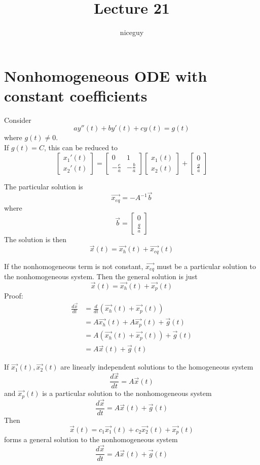 \documentclass[12pt]{article}
\author{niceguy}
\title{Lecture 21}
\begin{document}
\maketitle

\section{Nonhomogeneous ODE with constant coefficients}

Consider
$$ay''(t) + by'(t) + cy(t) = g(t)$$
where $g(t) \neq 0$. \\
If $g(t) = C$, this can be reduced to
$$\begin{bmatrix} x_1'(t) \\ x_2'(t)\end{bmatrix} = \begin{bmatrix} 0 & 1 \\ -\frac{c}{a} & -\frac{b}{a}\end{bmatrix} \begin{bmatrix} x_1(t) \\ x_2(t)\end{bmatrix} + \begin{bmatrix} 0 \\ \frac{g}{a}\end{bmatrix}$$

The particular solution is
$$\vec{x_{eq}} = -A^{-1}\vec{b}$$
where $$\vec{b} = \begin{bmatrix} 0 \\ \frac{g}{a}\end{bmatrix}$$
The solution is then
$$\vec{x}(t) = \vec{x_h}(t) + \vec{x_{eq}}(t)$$

If the nonhomogeneous term is not constant, $\vec{x_{eq}}$ must be a particular solution to the nonhomogeneous system. Then the general solution is just
$$\vec{x}(t) = \vec{x_h}(t) + \vec{x_p}(t)$$
Proof:
\begin{align*}
	\frac{d\vec{x}}{dt} &= \frac{d}{dt}\left(\vec{x_h}(t) + \vec{x_p}(t)\right) \\
			    &= A\vec{x_h}(t) + A\vec{x_p}(t) + \vec{g}(t) \\
			    &= A\left(\vec{x_h}(t) + \vec{x_p}(t)\right) + \vec{g}(t) \\
			    &= A\vec{x}(t) + \vec{g}(t)
\end{align*}

\begin{thm}
	If $\vec{x_1}(t), \vec{x_2}(t)$ are linearly independent solutions to the homogeneous system
	$$\frac{d\vec{x}}{dt} = A\vec{x}(t)$$
	and $\vec{x_p}(t)$ is a particular solution to the nonhomogeneous system
	$$\frac{d\vec{x}}{dt} = A\vec{x}(t) + \vec{g}(t)$$
	Then
	$$\vec{x}(t) = c_1\vec{x_1}(t) + c_2\vec{x_2}(t) + \vec{x_p}(t)$$
	forms a general solution to the nonhomogeneous system
	$$\frac{d\vec{x}}{dt} = A\vec{x}(t) + \vec{g}(t)$$
\end{thm}
\end{document}
